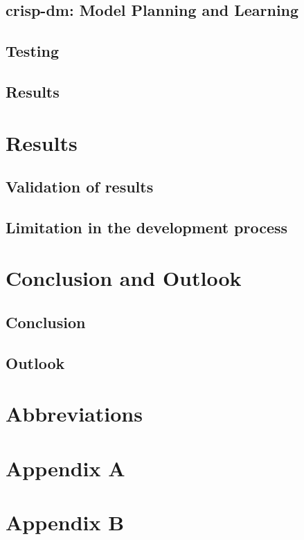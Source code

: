 \section{\ac{crisp-dm}: Model Planning and Learning}
\section{Testing}
\section{Results} 

\chapter{Results}
\section{Validation of results}
\section{Limitation in the development process}

\chapter{Conclusion and Outlook}
\section{Conclusion}
\section{Outlook}


\chapter{Abbreviations}


\printbibliography[heading=bibintoc]

\chapter{Appendix A}\label{appendix a}

\chapter{Appendix B}\label{appendix b}
%


